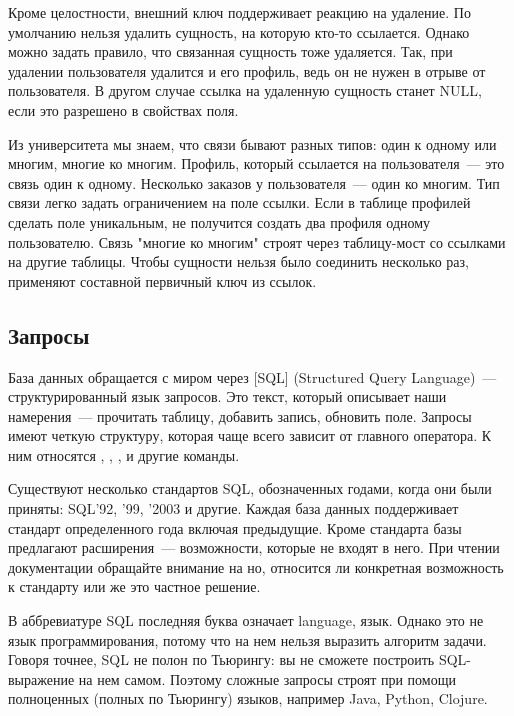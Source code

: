 Кроме целостности, внешний ключ поддерживает реакцию на удаление. По умолчанию нельзя удалить сущность, на которую кто-то ссылается. Однако можно задать правило, что связанная сущность тоже удаляется. Так, при удалении пользователя удалится и его профиль, ведь он не нужен в отрыве от пользователя. В другом случае ссылка на удаленную сущность станет NULL, если это разрешено в свойствах поля.

Из университета мы знаем, что связи бывают разных типов: один к одному или многим, многие ко многим. Профиль, который ссылается на пользователя~--- это связь один к одному. Несколько заказов у пользователя~--- один ко многим. Тип связи легко задать ограничением на поле ссылки. Если в таблице профилей сделать поле  уникальным, не получится создать два профиля одному пользователю. Связь "многие ко многим" строят через таблицу-мост со ссылками на другие таблицы. Чтобы сущности нельзя было соединить несколько раз, применяют составной первичный ключ из ссылок.

\subsection{Запросы}

\def\urlsql{https://en.wikipedia.org/wiki/SQL}

База данных обращается с миром через \footurl{SQL}{\urlsql}[SQL] (Structured Query Language)~--- структурированный язык запросов. Это текст, который описывает наши намерения~--- прочитать таблицу, добавить запись, обновить поле. Запросы имеют четкую структуру, которая чаще всего зависит от главного оператора. К ним относятся , , ,  и другие команды.

Существуют несколько стандартов SQL, обозначенных годами, когда они были приняты: SQL'92, '99, '2003 и другие. Каждая база данных поддерживает стандарт определенного года включая предыдущие. Кроме стандарта базы предлагают расширения~--- возможности, которые не входят в него. При чтении документации обращайте внимание на но, относится ли конкретная возможность к стандарту или же это частное решение.

В аббревиатуре SQL последняя буква означает language, язык. Однако это не язык программирования, потому что на нем нельзя выразить алгоритм задачи. Говоря точнее, SQL не полон по Тьюрингу: вы не сможете построить SQL-выражение на нем самом. Поэтому сложные запросы строят при помощи полноценных (полных по Тьюрингу) языков, например Java, Python, Clojure.

